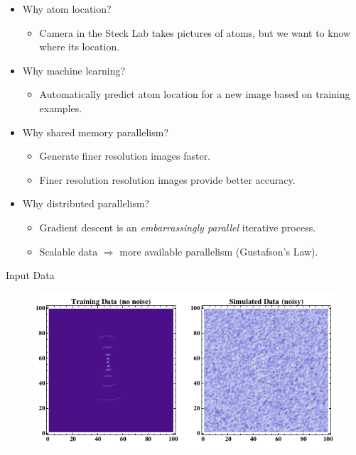 \documentclass{beamer}
\begin{document}
\begin{frame}

\begin{itemize}
\item Why atom location?
	\begin{itemize}
	\item Camera in the Steck Lab takes pictures of atoms, but we want to know where its location.
	\end{itemize}
\item Why machine learning? 
	\begin{itemize}
	\item Automatically predict atom location for a new image based on training examples.
	\end{itemize}
\item Why shared memory parallelism?
	\begin{itemize}
	\item Generate finer resolution images faster.
	\item Finer resolution resolution images provide better accuracy. 
	\end{itemize}
\item Why distributed parallelism? 
	\begin{itemize}
	\item Gradient descent is an \emph{embarrassingly parallel} iterative process.
	\item Scalable data $\Rightarrow$ more available parallelism (Gustafson's Law).
	\end{itemize}
\end{itemize}

\end{frame}


\begin{frame}{Input Data}

\begin{figure}
  \centering
  \includegraphics[scale=0.5]{ccd2D.png}
\end{figure}

\end{frame}
\end{document}
